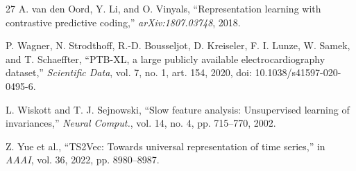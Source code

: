 \documentclass{article}
\begin{document}
\begin{thebibliography}{27}
 A. van den Oord, Y. Li, and O. Vinyals, ``Representation learning with contrastive predictive coding,'' \emph{arXiv:1807.03748}, 2018.

 P. Wagner, N. Strodthoff, R.-D. Bousseljot, D. Kreiseler, F. I. Lunze, W. Samek, and T. Schaeffter, ``PTB-XL, a large publicly available electrocardiography dataset,'' \emph{Scientific Data}, vol. 7, no. 1, art. 154, 2020, doi: 10.1038/s41597-020-0495-6.

 L. Wiskott and T. J. Sejnowski, ``Slow feature analysis: Unsupervised learning of invariances,'' \emph{Neural Comput.}, vol. 14, no. 4, pp. 715--770, 2002.

 Z. Yue et al., ``TS2Vec: Towards universal representation of time series,'' in \emph{AAAI}, vol. 36, 2022, pp. 8980--8987.

\end{thebibliography}

\clearpage
\normalsize

\end{document}
